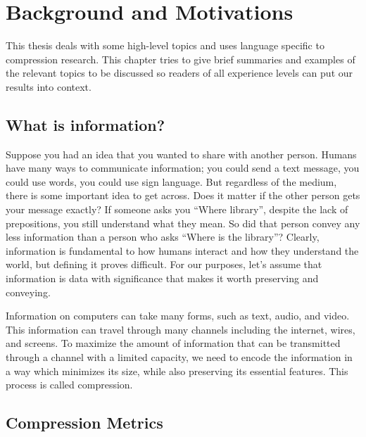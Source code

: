 \documentclass[12pt,twoside]{reedthesis}
\begin{document}
\mainmatter %
\pagestyle{fancyplain} %

\hypertarget{background-and-motivations}{%
\chapter{Background and Motivations}\label{background-and-motivations}}

This thesis deals with some high-level topics and uses language specific to compression research. This chapter tries to give brief summaries and examples of the relevant topics to be discussed so readers of all experience levels can put our results into context.

\hypertarget{what-is-information}{%
\section{What is information?}\label{what-is-information}}

Suppose you had an idea that you wanted to share with another person. Humans have many ways to communicate information; you could send a text message, you could use words, you could use sign language. But regardless of the medium, there is some important idea to get across. Does it matter if the other person gets your message exactly? If someone asks you ``Where library'', despite the lack of prepositions, you still understand what they mean. So did that person convey any less information than a person who asks ``Where is the library''?
Clearly, information is fundamental to how humans interact and how they understand the world, but defining it proves difficult. For our purposes, let's assume that information is data with significance that makes it worth preserving and conveying.

Information on computers can take many forms, such as text, audio, and video. This information can travel through many channels including the internet, wires, and screens. To maximize the amount of information that can be transmitted through a channel with a limited capacity, we need to encode the information in a way which minimizes its size, while also preserving its essential features. This process is called compression.

\hypertarget{compression-metrics}{%
\section{Compression Metrics}\label{compression-metrics}}
\end{document}

